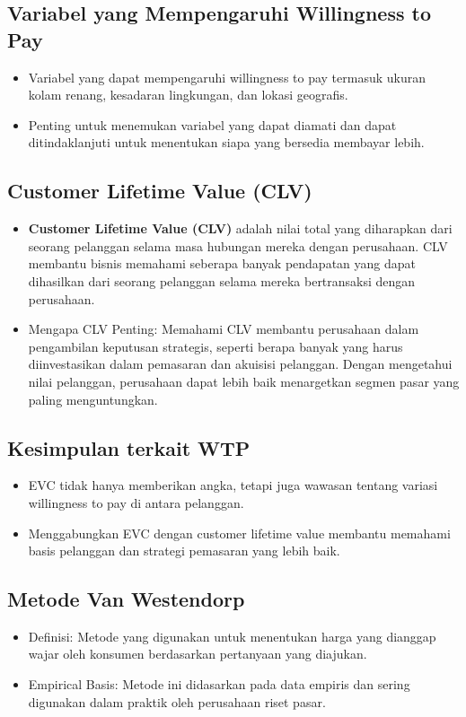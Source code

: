 \documentclass{article}
\begin{document}
\subsection{Variabel yang Mempengaruhi Willingness to Pay}
\begin{itemize}
    \item Variabel yang dapat mempengaruhi willingness to pay termasuk ukuran kolam renang, kesadaran lingkungan, dan lokasi geografis.
    \item Penting untuk menemukan variabel yang dapat diamati dan dapat ditindaklanjuti untuk menentukan siapa yang bersedia membayar lebih.
\end{itemize}

\subsection{Customer Lifetime Value (CLV)}
\begin{itemize}
    \item \textbf{Customer Lifetime Value (CLV)} adalah nilai total yang diharapkan dari seorang pelanggan selama masa hubungan mereka dengan perusahaan. CLV membantu bisnis memahami seberapa banyak pendapatan yang dapat dihasilkan dari seorang pelanggan selama mereka bertransaksi dengan perusahaan.
    \item Mengapa CLV Penting: Memahami CLV membantu perusahaan dalam pengambilan keputusan strategis, seperti berapa banyak yang harus diinvestasikan dalam pemasaran dan akuisisi pelanggan. Dengan mengetahui nilai pelanggan, perusahaan dapat lebih baik menargetkan segmen pasar yang paling menguntungkan.
\end{itemize}

\subsection{Kesimpulan terkait WTP}
\begin{itemize}
    \item EVC tidak hanya memberikan angka, tetapi juga wawasan tentang variasi willingness to pay di antara pelanggan.
    \item Menggabungkan EVC dengan customer lifetime value membantu memahami basis pelanggan dan strategi pemasaran yang lebih baik.
\end{itemize}

\subsection{Metode Van Westendorp}
\begin{itemize}
    \item Definisi: Metode yang digunakan untuk menentukan harga yang dianggap wajar oleh konsumen berdasarkan pertanyaan yang diajukan.
    \item Empirical Basis: Metode ini didasarkan pada data empiris dan sering digunakan dalam praktik oleh perusahaan riset pasar.
\end{itemize}
\end{document}
